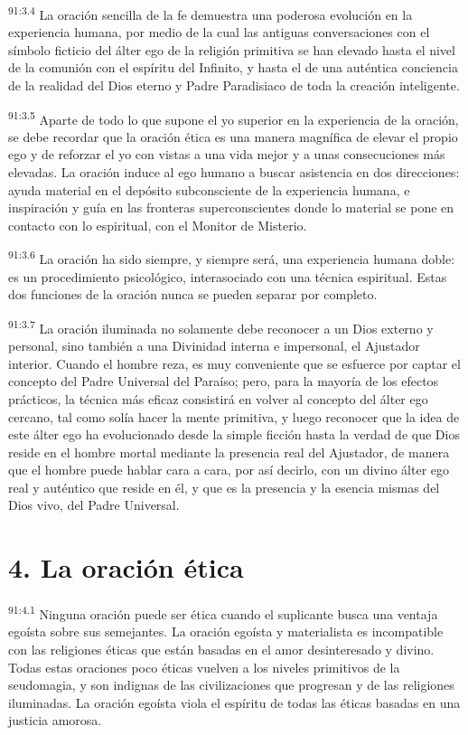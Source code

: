 \par
\textsuperscript{91:3.4} La oración sencilla de la fe demuestra una poderosa evolución en la experiencia humana, por medio de la cual las antiguas conversaciones con el símbolo ficticio del álter ego de la religión primitiva se han elevado hasta el nivel de la comunión con el espíritu del Infinito, y hasta el de una auténtica conciencia de la realidad del Dios eterno y Padre Paradisiaco de toda la creación inteligente.

\par
\textsuperscript{91:3.5} Aparte de todo lo que supone el yo superior en la experiencia de la oración, se debe recordar que la oración ética es una manera magnífica de elevar el propio ego y de reforzar el yo con vistas a una vida mejor y a unas consecuciones más elevadas. La oración induce al ego humano a buscar asistencia en dos direcciones: ayuda material en el depósito subconsciente de la experiencia humana, e inspiración y guía en las fronteras superconscientes donde lo material se pone en contacto con lo espiritual, con el Monitor de Misterio.

\par
\textsuperscript{91:3.6} La oración ha sido siempre, y siempre será, una experiencia humana doble: es un procedimiento psicológico, interasociado con una técnica espiritual. Estas dos funciones de la oración nunca se pueden separar por completo.

\par
\textsuperscript{91:3.7} La oración iluminada no solamente debe reconocer a un Dios externo y personal, sino también a una Divinidad interna e impersonal, el Ajustador interior. Cuando el hombre reza, es muy conveniente que se esfuerce por captar el concepto del Padre Universal del Paraíso; pero, para la mayoría de los efectos prácticos, la técnica más eficaz consistirá en volver al concepto del álter ego cercano, tal como solía hacer la mente primitiva, y luego reconocer que la idea de este álter ego ha evolucionado desde la simple ficción hasta la verdad de que Dios reside en el hombre mortal mediante la presencia real del Ajustador, de manera que el hombre puede hablar cara a cara, por así decirlo, con un divino álter ego real y auténtico que reside en él, y que es la presencia y la esencia mismas del Dios vivo, del Padre Universal.

\section*{4. La oración ética}
\par
\textsuperscript{91:4.1} Ninguna oración puede ser ética cuando el suplicante busca una ventaja egoísta sobre sus semejantes. La oración egoísta y materialista es incompatible con las religiones éticas que están basadas en el amor desinteresado y divino. Todas estas oraciones poco éticas vuelven a los niveles primitivos de la seudomagia, y son indignas de las civilizaciones que progresan y de las religiones iluminadas. La oración egoísta viola el espíritu de todas las éticas basadas en una justicia amorosa.

